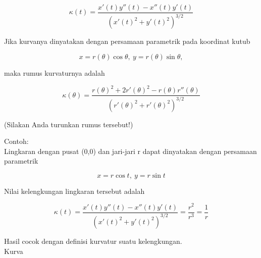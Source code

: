 \documentclass[a4paper,10pt]{article}
\begin{document}
\begin{eulernotebook}
\begin{eulercomment}
\begin{eulercomment}
\begin{eulercomment}
\begin{eulercomment}
\begin{eulercomment}
\begin{eulercomment}
\begin{eulercomment}
\begin{eulercomment}
\begin{eulercomment}
\begin{eulercomment}
\begin{eulercomment}
\begin{eulercomment}
\begin{eulercomment}
\begin{eulercomment}
\begin{eulercomment}
\begin{eulercomment}
\begin{eulercomment}
\begin{eulercomment}
\begin{eulercomment}
\begin{eulercomment}
\begin{eulercomment}
\begin{eulercomment}
\begin{eulercomment}
\end{eulercomment}
\begin{eulerformula}
\[
\kappa(t) = \frac{x'(t)y''(t)-x''(t)y'(t)}{\left(x'(t)^2+y'(t)^2\right)^{3/2}}
\]
\end{eulerformula}
\begin{eulercomment}
Jika kurvanya dinyatakan dengan persamaan parametrik pada koordinat
kutub

\end{eulercomment}
\begin{eulerformula}
\[
x=r(\theta)\cos\theta,\ y=r(\theta)\sin\theta,
\]
\end{eulerformula}
\begin{eulercomment}
maka rumus kurvaturnya adalah

\end{eulercomment}
\begin{eulerformula}
\[
\kappa(\theta) = \frac{r(\theta)^2+2r'(\theta)^2-r(\theta)r''(\theta)}{\left(r'(\theta)^2+r'(\theta)^2\right)^{3/2}}
\]
\end{eulerformula}
\begin{eulercomment}
(Silakan Anda turunkan rumus tersebut!)

Contoh:\\
Lingkaran dengan pusat (0,0) dan jari-jari r dapat dinyatakan dengan
persamaan parametrik

\end{eulercomment}
\begin{eulerformula}
\[
x=r\cos t,\ y=r\sin t
\]
\end{eulerformula}
\begin{eulercomment}
Nilai kelengkungan lingkaran tersebut adalah

\end{eulercomment}
\begin{eulerformula}
\[
\kappa(t)=\frac{x'(t)y''(t)-x''(t)y'(t)}{\left(x'(t)^2+y'(t)^2\right)^{3/2}}=\frac{r^2}{r^3}=\frac 1 r
\]
\end{eulerformula}
\begin{eulercomment}
Hasil cocok dengan definisi kurvatur suatu kelengkungan.\\
Kurva


\end{eulercomment}
\end{eulercomment}
\end{eulercomment}
\end{eulercomment}
\end{eulercomment}
\end{eulercomment}
\end{eulercomment}
\end{eulercomment}
\end{eulercomment}
\end{eulercomment}
\end{eulercomment}
\end{eulercomment}
\end{eulercomment}
\end{eulercomment}
\end{eulercomment}
\end{eulercomment}
\end{eulercomment}
\end{eulercomment}
\end{eulercomment}
\end{eulercomment}
\end{eulercomment}
\end{eulercomment}
\end{eulercomment}
\end{eulernotebook}
\end{document}
